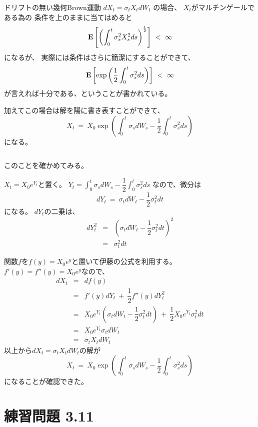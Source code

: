 \documentclass[uplatex,a4j,12pt,dvipdfmx]{jsarticle}
\begin{document}
ドリフトの無い幾何Brown運動
$ dX_{t} = \sigma_{t} X_{t} dW_{t} $
の場合、
$X_{t}$がマルチンゲールである為の
条件を上のままに当てはめると
$$
	{\bf E}
	\left[
		\left(
		\int^{t}_{0} \sigma_{s}^{2} X_{s}^{2} ds
		\right)^{\frac{1}{2}}
		\right]
	\ < \
	\infty
$$
になるが、
実際には条件はさらに簡潔にすることができて、
$$
	{\bf E}
	\left[
		\exp
		\left(
		\dfrac{1}{2}
		\int^{t}_{0} \sigma_{s}^{2} ds
		\right)
		\right]
	\ < \
	\infty
$$
が言えれば十分である、ということが書かれている。

加えてこの場合は解を陽に書き表すことができて、
$$
	X_{t}
	\ = \
	X_{0}
	\exp
	\left(
	\int^{t}_{0}
	\sigma_{s} dW_{s}
	-
	\dfrac{1}{2}
	\int^{t}_{0} \sigma_{s}^{2} ds
	\right)
$$
になる。

${}$

このことを確かめてみる。

$X_{t} = X_{0} e^{Y_{t}}$と置く。
$Y_{t} =
	\displaystyle
	\int^{t}_{0}
	\sigma_{s} dW_{s}
	-
	\dfrac{1}{2}
	\int^{t}_{0} \sigma_{s}^{2} ds
$
なので、微分は
$$
	d Y_{t}
	\ = \
	\sigma_{t} dW_{t}
	-
	\dfrac{1}{2}
	\sigma_{t}^{2} dt
$$
になる。
$dY_{t}$の二乗は、
%
\begin{eqnarray*}
	d Y_{t}^{2}
	&=&
	\left(
	\sigma_{t} dW_{t}
	-
	\dfrac{1}{2}
	\sigma_{t}^{2} dt
	\right)^{2}
	\\ &=&
	\sigma_{t}^{2} dt
\end{eqnarray*}
%

関数$f$を$f(y)=X_{0} e^{y}$と置いて伊藤の公式を利用する。
$f'(y) = f''(y) = X_{0} e^{y}$なので、
%
\begin{eqnarray*}
	d X_{t}
	&=&
	d f(y)
	\\ &=&
	f'(y) dY_{t}
	\ + \
	\dfrac{1}{2} f''(y) dY_{t}^{2}
	\\ &=&
	X_{0} e^{Y_{t}}
	\left(
	\sigma_{t} dW_{t}
	-
	\dfrac{1}{2}
	\sigma_{t}^{2} dt
	\right)
	\ + \
	\dfrac{1}{2}
	X_{0} e^{Y_{t}}
	\sigma_{t}^{2} dt
	\\ &=&
	X_{0} e^{Y_{t}}
	\sigma_{t} dW_{t}
	\\ &=&
	\sigma_{t} X_{t} dW_{t}
\end{eqnarray*}
%
以上から$dX_{t} = \sigma_{t} X_{t} dW_{t}$の解が
$$
	X_{t}
	\ = \
	X_{0}
	\exp
	\left(
	\int^{t}_{0}
	\sigma_{s} dW_{s}
	-
	\dfrac{1}{2}
	\int^{t}_{0} \sigma_{s}^{2} ds
	\right)
$$
になることが確認できた。

\section{練習問題 3.11}
\end{document}
